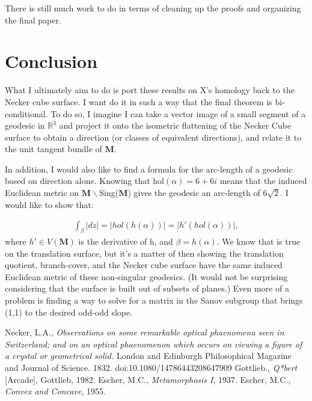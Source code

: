 \documentclass[]{article}
\begin{document}
There is still much work to do in terms of cleaning up the proofs and organizing the final paper.

\newpage
\section*{Conclusion}
What I ultimately aim to do is port these results on X's homology back to the Necker cube surface. I want do it in such a way that the final theorem is bi-conditional. To do so, I imagine I can take a vector image of a small segment of a geodesic in $\mathbb{R}^3$ and project it onto the isometric flattening of the Necker Cube surface to obtain a direction (or classes of equivalent directions), and relate it to the unit tangent bundle of $\mathbf{M}$.

In addition, I would also like to find a formula for the arc-length of a geodesic based on direction alone. Knowing that hol$(\alpha)=6+6i$ means that the induced Euclidean metric on $\mathbf{M}\backslash$Sing($\mathbf{M}$) gives the geodesic an arc-length of $6\sqrt{2}$. I would like to show that:

\begin{align*}
\int_{\beta}|dz|=|hol(h(\alpha))|=|h'(hol(\alpha))|,
\end{align*}
\noindent where $h'\in V(\mathbf{M})$ is the derivative of h, and $\beta=h(\alpha)$. We know that is true on the translation surface, but it's a matter of then showing the translation quotient, branch-cover, and the Necker cube surface have the same induced Euclidean metric of these non-singular geodesics. (It would not be surprising considering that the surface is built out of subsets of planes.) Even more of a problem is finding a way to solve for a matrix in the Sanov subgroup that brings (1,1) to the desired odd-odd slope.



\newpage
\begin{thebibliography}{9}
 Necker, L.A., \emph{Observations on some remarkable optical phaenomena seen in Switzerland; and on an optical phaenomenon which occurs on viewing a figure of a crystal or geometrical solid.} London and Edinburgh Philosophical Magazine and Journal of Science. 1832. doi:10.1080/14786443208647909
 Gottlieb., \emph{Q*bert} [Arcade], Gottlieb, 1982.
 Escher, M.C., \emph{Metamorphosis I}, 1937.
 Escher, M.C., \emph{Convex and Concave}, 1955.
\end{thebibliography}
\end{document}
